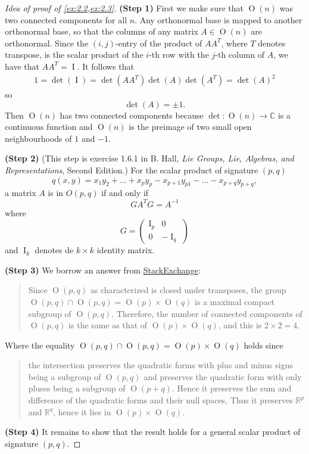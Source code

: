 \documentclass{article}
\numberwithin{equation}{section}
\newcommand{\R}{\mathbb{R}}
\newcommand{\C}{\mathbb{C}}
\renewcommand{\O}{\operatorname{O}}
\DeclareMathOperator{\I}{I}
\begin{document}
\begin{proof}[Idea of proof of \cref{ex:2.2,ex:2.3}]\leavevmode
	
	\textbf{(Step 1)} First we make sure that $\O(n)$ was two connected components for all $n$. Any orthonormal base is mapped to another orthonormal base, so that the columns of any matrix $A\in\O(n)$ are orthonormal. Since the $(i,j)$-entry of the product of $AA^T$, where $T$ denotes transpose, is the scalar product of the $i$-th row with the $j$-th column of $A$, we have that $AA^T=\I$. It follows that
	\begin{align*}
		1=\det(\I)=\det(AA^T)\det(A)\det(A^T)=\det(A)^2
	\end{align*}
	so
	\[\det(A)=\pm1.\]
	Then $\O(n)$ has two connected components because $\det:\O(n)\to\C$ is a continuous function and $\O(n)$ is the preimage of two small open neighbourhoods of $1$ and $-1$.
	
	\textbf{(Step 2)} \iffalse Next we claim that if $q(x,y)=x_1y_1-x_2y_2$, a matrix $A$ is in $O(1,1)$ if and only if \[GA^TG=A^{-1}\] where
	\[G=\begin{pmatrix}
		1&0\\
		0&-1
	\end{pmatrix}.\]\fi
	(This step is exercise 1.6.1 in B. Hall, \textit{Lie Groups, Lie, Algebras, and Representations}, Second Edition.)
	For the scalar product of signature $(p,q)$ \[q(x,y)=x_1y_2+\ldots+x_py_p-x_{p+1}y_{p
	1}-\ldots-x_{p+q}y_{p+q},\]
	a matrix $A$ is in $O(p,q)$ if and only if \[GA^TG=A^{-1}\] where
	\[G=\begin{pmatrix}
		\I_p&0\\
		0&-\I_q
	\end{pmatrix}\]
	and $\I_k$ denotes de $k\times k$ identity matrix.
	
	\textbf{(Step 3)} We borrow an answer from \href{https://mathoverflow.net/questions/297985/why-is-onk-not-connected-and-has-four-connected-components?_gl=1*e8aadb*_ga*MjE5NTQwOTAxLjE3MTE3MzY5Njk.*_ga_S812YQPLT2*MTcxMTczNjk2OS4xLjAuMTcxMTczNjk2OS4wLjAuMA..}{StackExchange}:
	\begin{quote}
		Since $\O(p,q)$ as characterized is closed under transposes, the group $\O(p,q)\cap\O(p,q)=\O(p)\times\O(q)$ is a maximal compact subgroup of $\O(p,q)$. Therefore, the number of connected components of $\O(p,q)$ is the same as that of $\O(p)\times\O(q)$, and this is $2\times 2=4$.
	\end{quote}
	Where the equality $\O(p,q)\cap\O(p,q)=\O(p)\times\O(q)$ holds since
	\begin{quote}
		the intersection preserves the quadratic forms with plus and minus signs being a subgroup of $\O(p,q)$ and preserves the quadratic form with only pluses being a subgroup of $\O(p+q)$. Hence it preserves the sum and difference of the quadratic forms and their null spaces, Thus it preserves $\R^p$ and $\R^q$, hence it lies in $\O(p)\times\O(q)$.
	\end{quote}
	
	\textbf{(Step 4)} It remains to show that the result holds for a general scalar product of signature $(p,q)$.
\end{proof}
\end{document}

